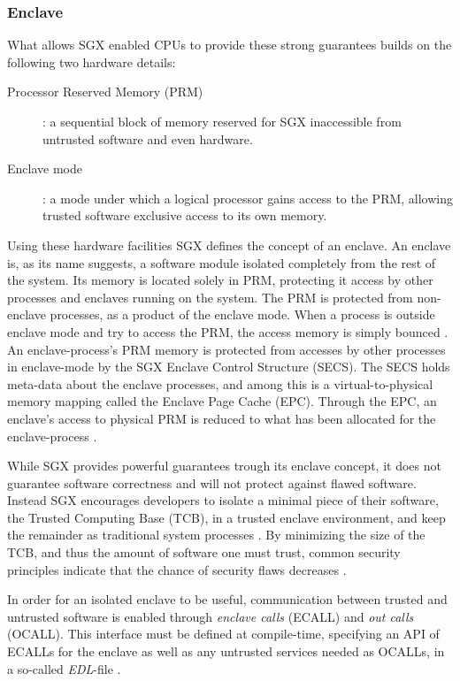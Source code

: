 \documentclass[12pt]{article}
\begin{document}
      \subsubsection{Enclave}
      What allows SGX enabled CPUs to provide these strong guarantees builds on the following two hardware details:
      \begin{description}
        \item [Processor Reserved Memory (PRM)]: a sequential block of memory reserved for SGX inaccessible from untrusted software and even hardware.
        \item [Enclave mode]: a mode under which a logical processor gains access to the PRM, allowing trusted software exclusive access to its own memory.
      \end{description}
      Using these hardware facilities SGX defines the concept of an enclave.
      An enclave is, as its name suggests, a software module isolated completely from the rest of the system.
      Its memory is located solely in PRM, protecting it access by other processes and enclaves running on the system. 
      The PRM is protected from non-enclave processes, as a product of the enclave mode. 
      When a process is outside enclave mode and try to access the PRM, the access memory is simply bounced \cite{intel-sgx-explained}.
      An enclave-process's PRM memory is protected from accesses by other processes in enclave-mode by the SGX Enclave Control Structure (SECS). 
      The SECS holds meta-data about the enclave processes, and among this is a virtual-to-physical memory mapping called the Enclave Page Cache (EPC). 
      Through the EPC, an enclave's access to physical PRM is reduced to what has been allocated for the enclave-process \cite{intel-sgx-explained}.

      While SGX provides powerful guarantees trough its enclave concept, it does not guarantee software correctness and will not protect against flawed software.
      Instead SGX encourages developers to isolate a minimal piece of their software, the Trusted Computing Base (TCB), in a trusted enclave environment, and keep the remainder as traditional system processes \cite{sgx-dev-guide}.
      By minimizing the size of the TCB, and thus the amount of software one must trust, common security principles indicate that the chance of security flaws decreases \cite{sgx-dev-guide}.

      In order for an isolated enclave to be useful, communication between trusted and untrusted software is enabled through \textit{enclave calls} (ECALL) and \textit{out calls} (OCALL).
      This interface must be defined at compile-time, specifying an API of ECALLs for the enclave as well as any untrusted services needed as OCALLs, in a so-called \textit{EDL}-file \cite{sgx-dev-guide}.
\end{document}
